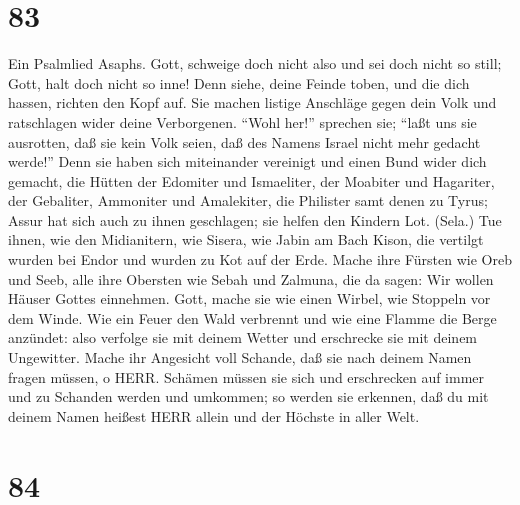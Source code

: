 \hypertarget{section-82}{%
\section{83}\label{section-82}}

 Ein Psalmlied Asaphs. Gott, schweige doch nicht also und
sei doch nicht so still; Gott, halt doch nicht so inne! 
Denn siehe, deine Feinde toben, und die dich hassen, richten den Kopf
auf.  Sie machen listige Anschläge gegen dein Volk und
ratschlagen wider deine Verborgenen.  ``Wohl her!'' sprechen
sie; ``laßt uns sie ausrotten, daß sie kein Volk seien, daß des Namens
Israel nicht mehr gedacht werde!''  Denn sie haben sich
miteinander vereinigt und einen Bund wider dich gemacht, 
die Hütten der Edomiter und Ismaeliter, der Moabiter und Hagariter,
 der Gebaliter, Ammoniter und Amalekiter, die Philister samt
denen zu Tyrus;  Assur hat sich auch zu ihnen geschlagen;
sie helfen den Kindern Lot. (Sela.)  Tue ihnen, wie den
Midianitern, wie Sisera, wie Jabin am Bach Kison,  die
vertilgt wurden bei Endor und wurden zu Kot auf der Erde. 
Mache ihre Fürsten wie Oreb und Seeb, alle ihre Obersten wie Sebah und
Zalmuna,  die da sagen: Wir wollen Häuser Gottes einnehmen.
 Gott, mache sie wie einen Wirbel, wie Stoppeln vor dem
Winde.  Wie ein Feuer den Wald verbrennt und wie eine
Flamme die Berge anzündet:  also verfolge sie mit deinem
Wetter und erschrecke sie mit deinem Ungewitter.  Mache ihr
Angesicht voll Schande, daß sie nach deinem Namen fragen müssen, o HERR.
 Schämen müssen sie sich und erschrecken auf immer und zu
Schanden werden und umkommen;  so werden sie erkennen, daß
du mit deinem Namen heißest HERR allein und der Höchste in aller Welt.

\hypertarget{section-83}{%
\section{84}\label{section-83}}

